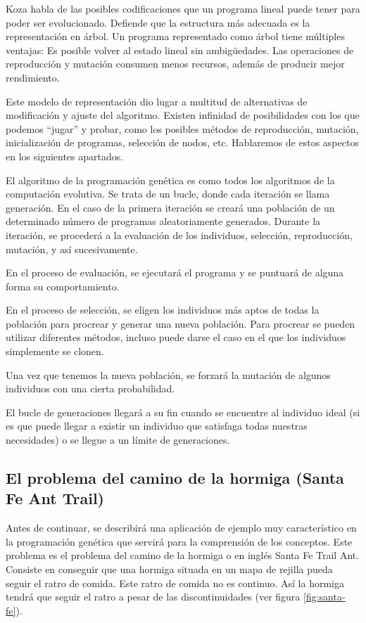 Koza habla de las posibles codificaciones que un programa lineal puede tener
 para poder ser evolucionado. Defiende que la estructura más adecuada es la
representación en árbol. Un programa representado como árbol tiene múltiples
ventajas: Es posible volver al estado lineal sin ambigüedades. Las operaciones de
reproducción y mutación consumen menos recursos, además de producir mejor
rendimiento.

Este modelo de representación dio lugar a multitud de alternativas de
modificación y ajuste del algoritmo. Existen infinidad de posibilidades con los
que podemos “jugar” y probar, como los posibles métodos de reproducción,
mutación, inicialización de programas, selección de nodos, etc. Hablaremos de
estos aspectos en los siguientes apartados.

El algoritmo de la programación genética es como todos los algoritmos de la
computación evolutiva. Se trata de un bucle, donde cada iteración se llama
generación. En el caso de la primera iteración se creará una población de un
determinado número de programas aleatoriamente generados. Durante la iteración,
se procederá a la evaluación de los individuos, selección, reproducción,
mutación, y así sucesivamente.

En el proceso de evaluación, se ejecutará el programa y se puntuará de alguna
forma su comportamiento.

En el proceso de selección, se eligen los individuos más aptos de todas la
población para procrear y generar una nueva población. Para procrear se pueden
utilizar diferentes métodos, incluso puede darse el caso en el que los individuos
simplemente se clonen.
 
Una vez que tenemos la nueva población, se forzará la mutación de algunos
individuos con una cierta probabilidad.

El bucle de generaciones llegará a su fin cuando se encuentre al individuo ideal
(si es que puede llegar a existir un individuo que satisfaga todas nuestras
necesidades) o se llegue a un límite de generaciones.



\subsection{El problema del camino de la hormiga (Santa Fe Ant Trail)}

Antes de continuar, se describirá una aplicación de ejemplo muy característico en
la programación genética que servirá para la comprensión de los conceptos. Este
problema es el problema del camino de la hormiga o en inglés Santa Fe Trail Ant.
Consiste en conseguir que una hormiga situada en un mapa de rejilla pueda
seguir el ratro de comida. Este ratro de comida no es continuo. Así la hormiga
tendrá que seguir el ratro a pesar de las discontinuidades (ver figura \ref{fig:santa-fe}).

